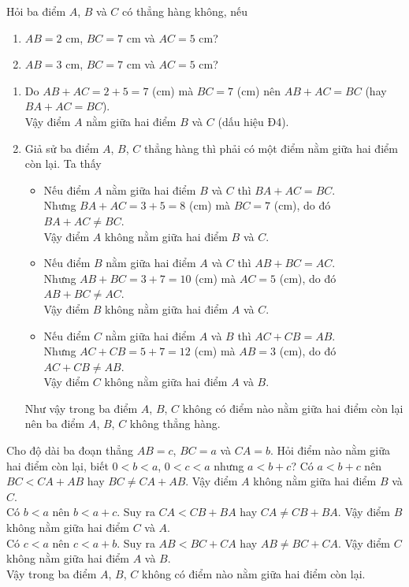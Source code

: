 \begin{vd}
	Hỏi ba điểm $A$, $B$ và $C$ có thẳng hàng không, nếu
	\begin{enumerate}
		\item $AB=2$ cm, $BC = 7$ cm và $AC = 5$ cm?
		\item $AB=3$ cm, $BC = 7$ cm và $AC = 5$ cm?
	\end{enumerate}
	\loigiai
	{
		\begin{enumerate}
			\item Do $AB+AC=2+5=7$ (cm) mà $BC = 7$ (cm) nên $AB+AC=BC$ (hay $BA+AC=BC$).\\
			Vậy điểm $A$ nằm giữa hai điểm $B$ và $C$ (dấu hiệu Đ4).
			\item Giả sử ba điểm $A$, $B$, $C$ thẳng hàng thì phải có một điểm nằm giữa hai điểm còn lại. Ta thấy
				\begin{itemize}
					\item Nếu điểm $A$ nằm giữa hai điểm $B$ và $C$ thì $BA+AC=BC$.\\
					Nhưng $BA+AC=3+5=8$ (cm) mà $BC = 7$ (cm), do đó $BA+AC \ne BC$.\\
					Vậy điểm $A$ không nằm giữa hai điểm $B$ và $C$.
					\item Nếu điểm $B$ nằm giữa hai điểm $A$ và $C$ thì $AB+BC=AC$.\\
					Nhưng $AB+BC=3+7=10$ (cm) mà $AC=5$ (cm), do đó $AB+BC \ne AC$.\\
					Vậy điểm $B$ không nằm giữa hai điểm $A$ và $C$.
					\item Nếu điểm $C$ nằm giữa hai điểm $A$ và $B$ thì $AC+CB=AB$.\\
					Nhưng $AC+CB=5+7=12$ (cm) mà $AB=3$ (cm), do đó $AC+CB \ne AB$.\\
					Vậy điểm $C$ không nằm giữa hai điểm $A$ và $B$.
				\end{itemize}
				Như vậy trong ba điểm $A$, $B$, $C$ không có điểm nào nằm giữa hai điểm còn lại nên ba điểm $A$, $B$, $C$ không thẳng hàng.
		\end{enumerate}
	}
\end{vd}

\begin{vd}
	Cho độ dài ba đoạn thẳng $AB=c$, $BC=a$ và $CA=b$. Hỏi điểm nào nằm giữa hai điểm còn lại, biết $0<b<a$, $0<c<a$ nhưng $a<b+c$?
	\loigiai
	{
		Có $a<b+c$ nên $BC<CA+AB$ hay $BC \ne CA+AB$. Vậy điểm $A$ không nằm giữa hai điểm $B$ và $C$.\\
		Có $b<a$ nên $b<a+c$. Suy ra $CA<CB+BA$ hay $CA \ne CB+BA$. Vậy điểm $B$ không nằm giữa hai điểm $C$ và $A$.\\
		Có $c<a$ nên $c<a+b$. Suy ra $AB<BC+CA$ hay $AB \ne BC+CA$. Vậy điểm $C$ không nằm giữa hai điểm $A$ và $B$.\\
		Vậy trong ba điểm $A$, $B$, $C$ không có điểm nào nằm giữa hai điểm còn lại.
	}
\end{vd}

